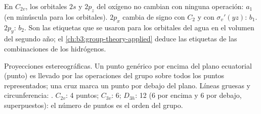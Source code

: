 \begin{example}\label{ex:b3:point-groups:water-orbitals}
En $C_{2v}$, los orbitales $2s$ y $2p_z$ del oxígeno no cambian con ninguna
operación: $a_1$ (en minúscula para los orbitales). $2p_x$ cambia de signo con $C_2$ y
con $\sigma_v'(yz)$: $b_1$. $2p_y$: $b_2$. Son las etiquetas que se usaron para los orbitales
del agua en el volumen del segundo año; el \cref{ch:b3:group-theory-applied} deduce las
etiquetas de las combinaciones de los hidrógenos.
\end{example}

\begin{omfigure}

{\small Proyecciones estereográficas. Un punto genérico por encima del plano
ecuatorial (punto) es llevado por las operaciones del grupo sobre todos los puntos
representados; una cruz marca un punto por debajo del plano. Líneas gruesas y circunferencia:
. $C_{2v}$: 4 puntos; $C_{3v}$: 6; $D_{3h}$: 12 (6 por encima y 6
por debajo, superpuestos): el número de puntos es el orden del grupo.}
\end{omfigure}

